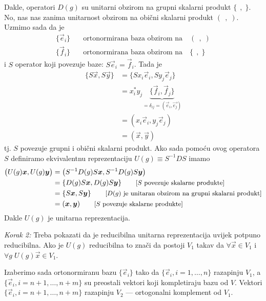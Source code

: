 Dakle, operatori $D(g)$ su unitarni obzirom na grupni skalarni produkt
$\{\;\,,\;\}$. No, nas nas zanima unitarnost obzirom na obični
skalarni produkt $(\;\,,\;)$.
Uzmimo sada da je
\begin{align*}
\{\vec{e}_i\} \quad &\text{ortonormirana baza obzirom na} \quad (\;\,,\;) \\
\{\vec{f}_i\} \quad &\text{ortonormirana baza obzirom na} \quad \{\;\,,\;\}
\end{align*}
i $S$ operator koji povezuje baze: $S\vec{e}_i = \vec{f}_i$. Tada je
\begin{equation*}
\begin{split}
\{ S \vec{x}, S \vec{y}\} &= \{ S x_i \vec{e}_i, S y_j \vec{e}_j \} \\
&= x_{i}^* y_{j}\underbrace{ \{\vec{f}_i, \vec{f}_j\}}_{=\delta_{ij} =
 (\vec{e}_i, \vec{e_j})} \\
&= (x_i \vec{e}_i, y_j \vec{e}_j) \\
&= (\vec{x}, \vec{y})
\end{split}
\end{equation*}
tj. $S$ povezuje grupni i obični skalarni produkt. Ako sada pomoću
ovog operatora $S$ definiramo
ekvivalentnu reprezentaciju $U(g)\equiv S^{-1}DS$ imamo
\begin{equation*}
\begin{split}
\big( U(g)\vec{x}, U(g)\vec{y}\big) &=
\big( S^{-1}D(g)S \vec{x}, S^{-1}D(g)S \vec{y}\big) \\
&= \{ D(g) S \vec{x}, D(g) S \vec{y} \} 
 \qquad \text{\small[$S$ povezuje skalarne produkte]}\\
&= \{ S \vec{x}, S \vec{y} \} \qquad
\text{\small[$D(g)$ je unitaran obzirom na grupni skalarni produkt]}\\
&= (\vec{x}, \vec{y}) \qquad \text{\small[$S$ povezuje skalarne produkte]}
\end{split}
\end{equation*}
Dakle $U(g)$ je unitarna reprezentacija.

\emph{Korak 2:} Treba pokazati da je reducibilna unitarna reprezentacija
uvijek potpuno reducibilna. Ako je $U(g)$ reducibilna to znači da postoji
$V_1$ takav da 
$\forall\vec{x} \in V_1$ i $\forall g\;  U(g) \vec{x} \in V_1 $.

Izaberimo sada ortonormiranu bazu $\{\vec{e}_i\}$ tako da 
$\{\vec{e}_i, i=1,\ldots, n\}$ razapinju $V_1$, a
$\{\vec{e}_i, i=n+1,\ldots, n+m \}$ su preostali vektori koji kompletiraju
bazu od $V$. Vektori $\{\vec{e}_i, i=n+1,\ldots, n+m \}$ razapinju $V_2$ ---
ortogonalni komplement od $V_1$. 

